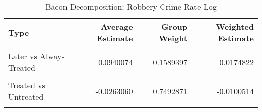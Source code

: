 \begin{table}[H]

\caption{\label{tab:tab:bacondecompositionRobbery}Bacon Decomposition: Robbery Crime Rate Log}
\centering
\begin{tabular}[t]{lrrr}
\toprule
Type & Average Estimate & Group Weight & Weighted Estimate\\
\midrule
\cellcolor{gray!6}{Earlier vs Later Treated} & \cellcolor{gray!6}{0.0961047} & \cellcolor{gray!6}{0.0683810} & \cellcolor{gray!6}{0.0073682}\\
Later vs Always Treated & 0.0940074 & 0.1589397 & 0.0174822\\
\cellcolor{gray!6}{Later vs Earlier Treated} & \cellcolor{gray!6}{0.1505417} & \cellcolor{gray!6}{0.0233921} & \cellcolor{gray!6}{0.0020947}\\
Treated vs Untreated & -0.0263060 & 0.7492871 & -0.0100514\\
\cellcolor{gray!6}{Total TWFE} & \cellcolor{gray!6}{NaN} & \cellcolor{gray!6}{NaN} & \cellcolor{gray!6}{0.0168936}\\
\bottomrule
\end{tabular}
\end{table}
